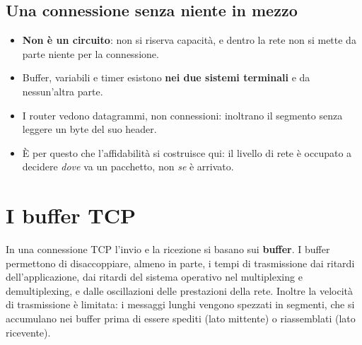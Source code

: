 \subsection{Una connessione senza niente in mezzo}


\begin{itemize}
    \item \textbf{Non è un circuito}: non si riserva capacità, e dentro la rete non si mette da parte niente per la
          connessione.
    \item Buffer, variabili e timer esistono \textbf{nei due sistemi terminali} e da nessun'altra parte.
    \item I router vedono datagrammi, non connessioni: inoltrano il segmento senza leggere un byte del suo header.
    \item È per questo che l'affidabilità si costruisce qui: il livello di rete è occupato a decidere \emph{dove} va un
          pacchetto, non \emph{se} è arrivato.
\end{itemize}

\section{I buffer TCP}

In una connessione TCP l'invio e la ricezione si basano sui \textbf{buffer}. I buffer permettono di
disaccoppiare, almeno in parte, i tempi di trasmissione dai ritardi dell'applicazione, dai ritardi del
sistema operativo nel multiplexing e demultiplexing, e dalle oscillazioni delle prestazioni della rete.
Inoltre la velocità di trasmissione è limitata: i messaggi lunghi vengono spezzati in segmenti, che si
accumulano nei buffer prima di essere spediti (lato mittente) o riassemblati (lato ricevente).

